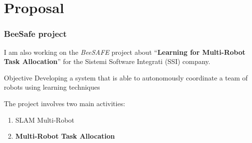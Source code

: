 \section{Proposal}

\begin{frame}
	\frametitle{BeeSafe project}
	
	I am also working on the \emph{BeeSAFE} project about ``\textbf{Learning for Multi-Robot Task Allocation}'' for
	the Sistemi Software Integrati (SSI) company.
	
	\vspace{0.4cm}
	
	\begin{block}{Objective}
		Developing a system that is able to autonomously coordinate a team of robots using learning techniques
	\end{block}
	
	\vspace{0.4cm}
	
	The project involves two main activities:
	
	\begin{enumerate}
		\item SLAM Multi-Robot
		\item \textbf{Multi-Robot Task Allocation}
	\end{enumerate}
\end{frame}

